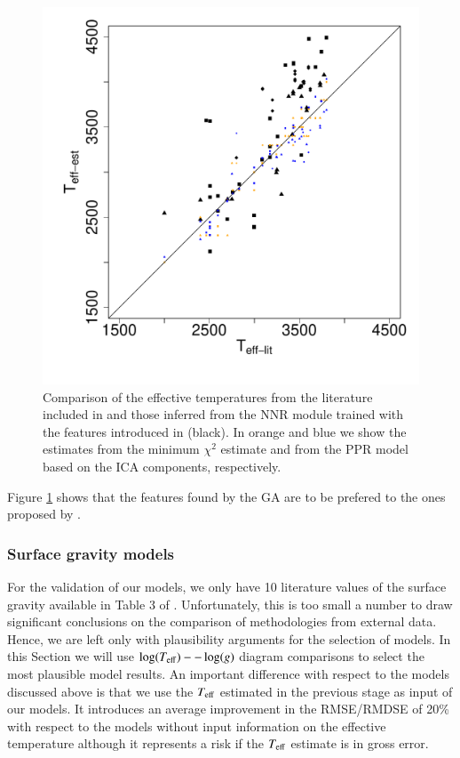 \begin {figure}
 \centering
  \includegraphics[scale=0.45]{figs/irtf-CESteffs-literature.pdf}
  
  \caption{Comparison of the effective temperatures from the
  literature included in \cite{cesetti} and those inferred from the
  NNR module trained with the features introduced in \cite{cesetti}
  (black). In orange and blue we show the estimates from the minimum
  $\chi^2$ estimate and from the PPR model based on the ICA
  components, respectively.}

\label{fig:irtf-cesteff}
\end {figure}

Figure \ref{fig:irtf-cesteff} shows that the features found by the GA
are to be prefered to the ones proposed by \cite{cesetti}. 

\subsubsection{Surface gravity models}

For the validation of our models, we only have 10 literature values of
the surface gravity available in Table 3 of
\cite{cesetti}. Unfortunately, this is too small a number to draw
significant conclusions on the comparison of methodologies from
external data. Hence, we are left only with plausibility arguments for
the selection of models. In this Section we will use $\log(T_{\rm
eff})--\log(g)$ diagram comparisons to select the most plausible model
results. An important difference with respect to the models discussed
above is that we use the $T_{\rm eff}$ estimated in the previous stage
as input of our models. It introduces an average improvement in the
RMSE/RMDSE of 20\% with respect to the models without input
information on the effective temperature although it represents a risk
if the $T_{\rm eff}$ estimate is in gross error.

